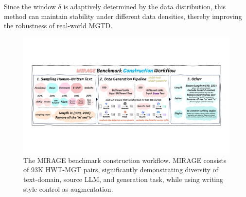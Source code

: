 Since the window $\delta$ is adaptively determined by the data distribution, this method can maintain stability under different data densities, thereby improving the robustness of real-world MGTD.

\begin{figure}
    \centering
    \includegraphics[width=\linewidth]{fig/workflow.pdf}
    \caption{The MIRAGE benchmark construction workflow. MIRAGE consists of 93K HWT-MGT pairs, significantly demonstrating diversity of text-domain, source LLM, and generation task, while using writing style control as augmentation. }
    \label{fig:workflow}
\end{figure}